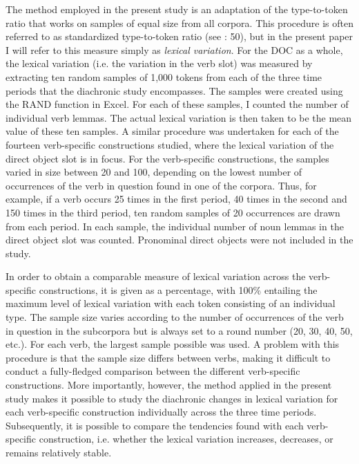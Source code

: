 \documentclass[output=paper]{langscibook}
\begin{document}
The method employed in the present study is an adaptation of the type-to-token ratio that works on samples of equal size from all corpora. This procedure is often referred to as standardized type-to-token ratio (see \citealt{McEneryHardie2012}: 50), but in the present paper I will refer to this measure simply as \textit{lexical variation}. For the DOC as a whole, the lexical variation (i.e. the variation in the verb slot) was measured by extracting ten random samples of 1,000 tokens from each of the three time periods that the diachronic study encompasses. The samples were created using the RAND function in Excel. For each of these samples, I counted the number of individual verb lemmas. The actual lexical variation is then taken to be the mean value of these ten samples. A similar procedure was undertaken for each of the fourteen verb-specific constructions studied, where the lexical variation of the direct object slot is in focus. For the verb-specific constructions, the samples varied in size between 20 and 100, depending on the lowest number of occurrences of the verb in question found in one of the corpora. Thus, for example, if a verb occurs 25 times in the first period, 40 times in the second and 150 times in the third period, ten random samples of 20 occurrences are drawn from each period. In each sample, the individual number of noun lemmas in the direct object slot was counted. Pronominal direct objects were not included in the study.



In order to obtain a comparable measure of lexical variation across the verb-specific constructions, it is given as a percentage, with 100\% entailing the maximum level of lexical variation with each token consisting of an individual type. The sample size varies according to the number of occurrences of the verb in question in the subcorpora but is always set to a round number (20, 30, 40, 50, etc.). For each verb, the largest sample possible was used. A problem with this procedure is that the sample size differs between verbs, making it difficult to conduct a fully-fledged comparison between the different verb-specific constructions. More importantly, however, the method applied in the present study makes it possible to study the diachronic changes in lexical variation for each verb-specific construction individually across the three time periods. Subsequently, it is possible to compare the tendencies found with each verb-specific construction, i.e. whether the lexical variation increases, decreases, or remains relatively stable.
\end{document}
